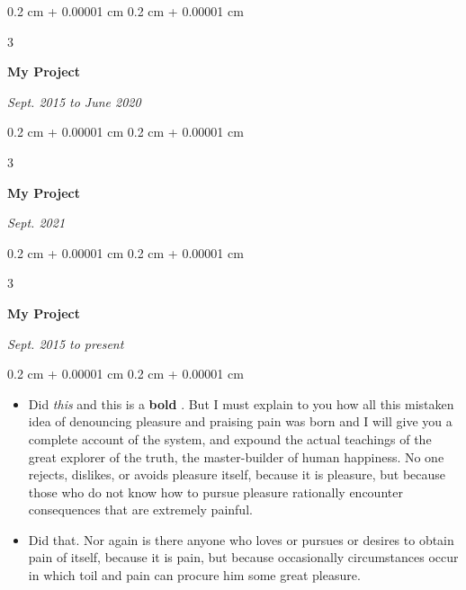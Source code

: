 \documentclass[10pt, letterpaper]{article}
\newenvironment{highlights}{
    \begin{itemize}[
        topsep=0.10 cm,
        parsep=0.10 cm,
        partopsep=0pt,
        itemsep=0pt,
        leftmargin=0.4 cm + 10pt + 0.6 cm
    ]
}{
    \end{itemize}
} %
\newenvironment{onecolentry}{
    \begin{adjustwidth}{
        0.2 cm + 0.00001 cm
    }{
        0.2 cm + 0.00001 cm
    }
}{
    \end{adjustwidth}
} %
\newenvironment{threecolentry}[3][]{
    \onecolentry
    \def\thirdColumn{#3}
    \setcolumnwidth{0.6 cm, \fill, 4.5 cm}
    \begin{paracol}{3}
    #2 \switchcolumn
}{
    \switchcolumn \raggedleft \thirdColumn
    \end{paracol}
    \endonecolentry
} %
\let\hrefWithoutArrow\href
\renewcommand{\href}[2]{\hrefWithoutArrow{#1}{\mbox{\ifthenelse{\equal{#2}{}}{ }{#2 }\raisebox{.15ex}{\footnotesize \faExternalLink*}}}}
\begin{document}
        \vspace{0.2 cm-3px}

        \begin{threecolentry}{
            \vspace*{\fill}
            \textbullet
            \vspace*{3px}
            \vspace*{\fill}
        }{
            
            
        \textit{Sept. 2015 to June 2020}}
            \textbf{My Project}
        \end{threecolentry}



        \vspace{0.2 cm-3px}

        \begin{threecolentry}{
            \vspace*{\fill}
            \textbullet
            \vspace*{3px}
            \vspace*{\fill}
        }{
            
            
        \textit{Sept. 2021}}
            \textbf{My Project}
        \end{threecolentry}



        \vspace{0.2 cm-3px}

        \begin{threecolentry}{
            \vspace*{\fill}
            \textbullet
            \vspace*{3px}
            \vspace*{\fill}
        }{
            
            
        \textit{Sept. 2015 to present}}
            \textbf{My Project}
        \end{threecolentry}

        \vspace{0.10 cm-3px}
        \begin{onecolentry}
            \begin{highlights}
                \item Did \textit{this} and this is a \textbf{bold} \href{https://example.com}{link}. But I must explain to you how all this mistaken idea of denouncing pleasure and praising pain was born and I will give you a complete account of the system, and expound the actual teachings of the great explorer of the truth, the master-builder of human happiness. No one rejects, dislikes, or avoids pleasure itself, because it is pleasure, but because those who do not know how to pursue pleasure rationally encounter consequences that are extremely painful.
                \item Did that. Nor again is there anyone who loves or pursues or desires to obtain pain of itself, because it is pain, but because occasionally circumstances occur in which toil and pain can procure him some great pleasure.
            \end{highlights}
        \end{onecolentry}
\end{document}
